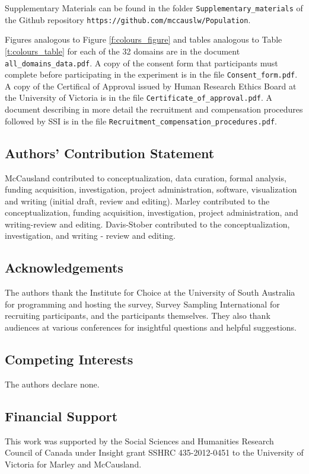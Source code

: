 \documentclass[11pt,letter]{article}
\begin{document}
Supplementary Materials can be found in the folder \texttt{Supplementary\_materials} of the Github repository \texttt{https://github.com/mccauslw/Population}.

Figures analogous to Figure \ref{f:colours_figure} and tables analogous to Table \ref{t:colours_table} for each of the 32 domains are in the document \texttt{all\_domains\_data.pdf}.
A copy of the consent form that participants must complete before participating in the experiment is in the file \texttt{Consent\_form.pdf}.
A copy of the Certifical of Approval issued by Human Research Ethics Board at the University of Victoria is in the file \texttt{Certificate\_of\_approval.pdf}.
A document describing in more detail the recruitment and compensation procedures followed by SSI is in the file \texttt{Recruitment\_compensation\_procedures.pdf}.

\subsection*{Authors' Contribution Statement}

McCausland contributed to conceptualization, data curation, formal analysis, funding acquisition, investigation, project administration, software, visualization and writing (initial draft, review and editing).
Marley contributed to the conceptualization, funding acquisition, investigation, project administration, and writing-review and editing.
Davis-Stober contributed to the conceptualization, investigation, and writing - review and editing.

\subsection*{Acknowledgements}

The authors thank the Institute for Choice at the University of South Australia for programming and hosting the survey, Survey Sampling International for recruiting participants, and the participants themselves.
They also thank audiences at various conferences for insightful questions and helpful suggestions.

\subsection*{Competing Interests}

The authors declare none.

\subsection*{Financial Support}

This work was supported by the Social Sciences and Humanities Research Council of Canada under Insight grant SSHRC 435-2012-0451 to the University of Victoria for Marley and McCausland.



\end{document}
